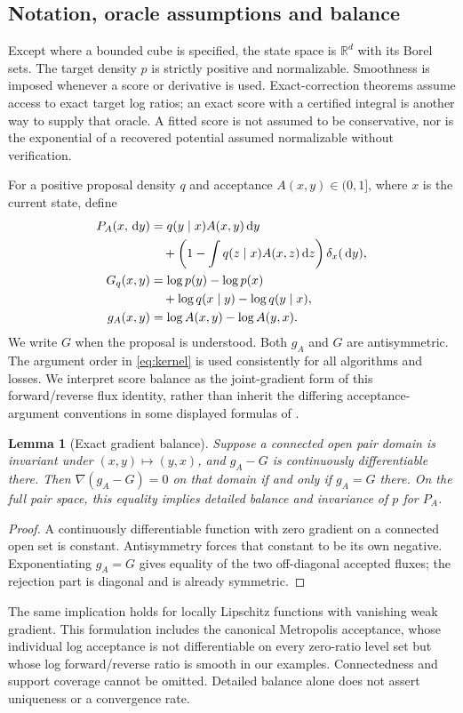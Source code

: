 \documentclass[pdflatex,iicol,sn-mathphys-ay]{sn-jnl}
\newtheorem{lemma}[theorem]{Lemma}
\theoremstyle{definition}\newtheorem{definition}[theorem]{Definition}
\theoremstyle{remark}\newtheorem{remark}[theorem]{Remark}
\numberwithin{equation}{section}
\newcommand{\R}{\mathbb R}\newcommand{\E}{\mathbb E}\newcommand{\Prob}{\mathbb P}
\newcommand{\dd}{\,\mathrm d}\newcommand{\cA}{c_\alpha}\newcommand{\sg}{\operatorname{sigmoid}}
\newcommand{\1}{\mathbf 1}
\begin{document}
\subsection{Notation, oracle assumptions and balance}
Except where a bounded cube is specified, the state space is $\R^d$ with its Borel sets. The target density $p$ is strictly positive and normalizable. Smoothness is imposed whenever a score or derivative is used. Exact-correction theorems assume access to exact target log ratios; an exact score with a certified integral is another way to supply that oracle. A fitted score is not assumed to be conservative, nor is the exponential of a recovered potential assumed normalizable without verification.

For a positive proposal density $q$ and acceptance $A(x,y)\in(0,1]$, where $x$ is the current state, define
\begin{align}
P_A(x,\dd y)&=q(y\mid x)A(x,y)\dd y \notag\\
&\quad+\left(1-\int q(z\mid x)A(x,z)\dd z\right)
  \delta_x(\dd y),\label{eq:kernel}\\
G_q(x,y)&=\log p(y)-\log p(x) \notag\\
&\quad+\log q(x\mid y)-\log q(y\mid x),\label{eq:G}\\
g_A(x,y)&=\log A(x,y)-\log A(y,x).\label{eq:g}
\end{align}
We write $G$ when the proposal is understood. Both $g_A$ and $G$ are antisymmetric. The argument order in \eqref{eq:kernel} is used consistently for all algorithms and losses. We interpret score balance as the joint-gradient form of this forward/reverse flux identity, rather than inherit the differing acceptance-argument conventions in some displayed formulas of \citet{fractional}.

\begin{lemma}[Exact gradient balance]\label{lem:gradientbalance}
Suppose a connected open pair domain is invariant under $(x,y)\mapsto(y,x)$, and $g_A-G$ is continuously differentiable there. Then $\nabla(g_A-G)=0$ on that domain if and only if $g_A=G$ there. On the full pair space, this equality implies detailed balance and invariance of $p$ for $P_A$.
\end{lemma}
\begin{proof}
A continuously differentiable function with zero gradient on a connected open set is constant. Antisymmetry forces that constant to be its own negative. Exponentiating $g_A=G$ gives equality of the two off-diagonal accepted fluxes; the rejection part is diagonal and is already symmetric.
\end{proof}
The same implication holds for locally Lipschitz functions with vanishing weak gradient. This formulation includes the canonical Metropolis acceptance, whose individual log acceptance is not differentiable on every zero-ratio level set but whose log forward/reverse ratio is smooth in our examples. Connectedness and support coverage cannot be omitted. Detailed balance alone does not assert uniqueness or a convergence rate.
\end{document}
